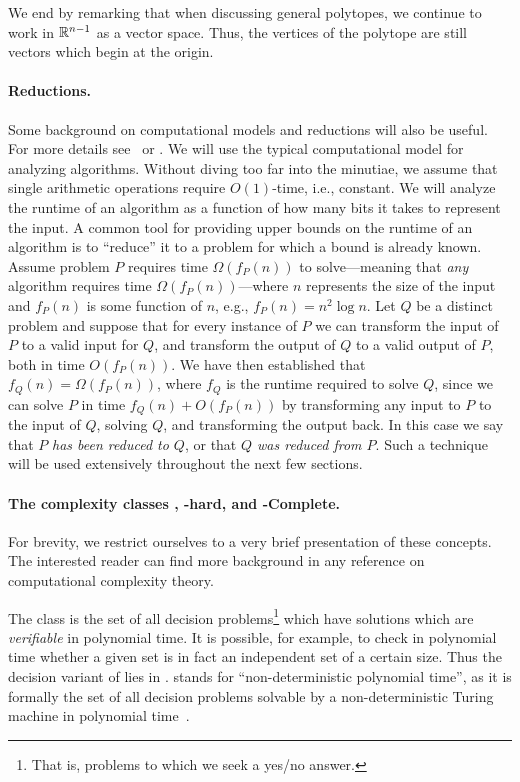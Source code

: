 We end by remarking that when discussing general  polytopes, we continue  to work  in $\mathbb{R}^{n-1}$ as a vector space. Thus,  the vertices of the polytope are still vectors which begin at the origin. 

\paragraph{Reductions.}
Some background on computational models and reductions will also be useful. For more details see~\cite{kleinberg2006algorithm} or \cite{knuth2011art}. We will use the typical computational model for analyzing algorithms. Without diving too far into the minutiae, we assume that single arithmetic operations require $O(1)$-time, i.e., constant. We will analyze the runtime of an algorithm as a function of how many bits it takes to represent the input. A common tool for providing upper bounds on the runtime of an algorithm is to ``reduce'' it to a problem for which a bound is already known. Assume problem $P$ requires time $\Omega(f_P(n))$ to solve---meaning that \emph{any} algorithm requires time $\Omega(f_P(n))$---where $n$ represents the size of the input and $f_P(n)$  is some function of $n$, e.g., $f_P(n) =  n^2\log n$. Let $Q$ be a distinct problem and suppose that for every instance of $P$ we can transform the input of $P$ to a valid input for $Q$, and transform the output of $Q$ to a valid output of $P$, both in time $O(f_P(n))$.  We have then established that $f_Q(n) = \Omega(f_P(n))$, where $f_Q$ is the runtime required to solve $Q$, since we can solve $P$ in time $f_Q(n) + O(f_P(n))$ by transforming any input to $P$ to the input of $Q$, solving $Q$, and transforming the output back. 
In  this case we say that $P$ \emph{has been reduced to  $Q$},  or that \emph{$Q$ was reduced from $P$}.
Such a technique will be used extensively throughout the next few sections. 

\paragraph{The complexity classes \NP, \NP-hard, and \NP-Complete.}
For brevity, we restrict ourselves to a very brief presentation of these concepts. The interested reader can find more background in any reference  on computational  complexity theory. 

The class \NP  is  the set of all decision problems\footnote{That is,  problems  to which we seek a yes/no answer.} which have solutions which are \emph{verifiable} in polynomial time. It is possible, for example, to check  in polynomial time whether  a given  set is in fact an independent set of a certain size. Thus the decision variant of \iset lies in \NP. \NP stands for ``non-deterministic polynomial time'', as it is formally the set of all  decision problems solvable by a non-deterministic Turing  machine in polynomial time~\cite{papadimitriou2003computational}. 

